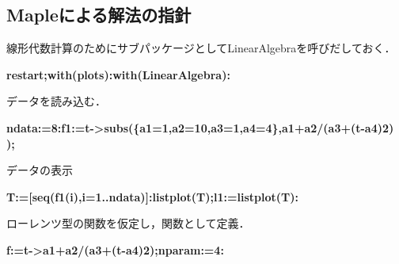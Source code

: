 \documentclass{article}
\begin{document}
\subsection{\textbf{Mapleによる解法の指針}}
\begin{maplegroup}
\begin{Maple Normal}{
線形代数計算のためにサブパッケージとしてLinearAlgebraを呼びだしておく．}\end{Maple Normal}

\textbf{restart;}\textbf{with(plots):}\textbf{with(LinearAlgebra):}\end{maplegroup}
\begin{maplegroup}
\begin{Maple Normal}{
データを読み込む．}\end{Maple Normal}

\textbf{ndata:=8:}\textbf{f1:=t->subs(\{a1=1,a2=10,a3=1,a4=4\},a1+a2/(a3+(t-a4)2) );}\mapleresult
\begin{maplelatex}
\end{maplelatex}
\end{maplegroup}
\begin{maplegroup}
\begin{Maple Normal}{
データの表示}\end{Maple Normal}

\textbf{T:=[seq(f1(i),i=1..ndata)]:}\textbf{listplot(T);}\textbf{l1:=listplot(T):}\mapleresult
{}
\end{maplegroup}
\begin{maplegroup}
\begin{Maple Normal}{
ローレンツ型の関数を仮定し，関数として定義．}\end{Maple Normal}

\textbf{f:=t->a1+a2/(a3+(t-a4)2);}\textbf{nparam:=4:}\mapleresult
\begin{maplelatex}
\end{maplelatex}
\end{maplegroup}
\end{document}
